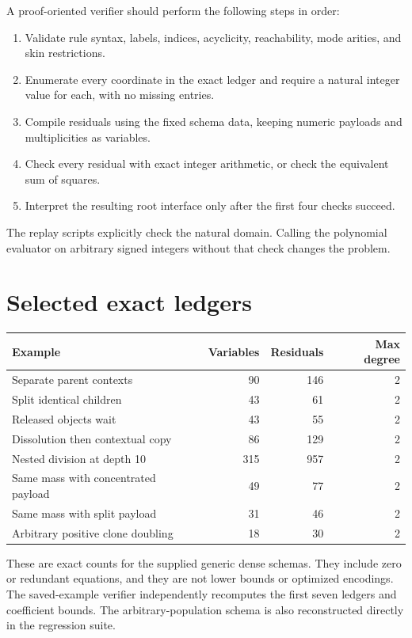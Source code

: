 \documentclass[11pt,letterpaper]{article}
\theoremstyle{definition}
\theoremstyle{remark}
\begin{document}
A proof-oriented verifier should perform the following steps in order:
\begin{enumerate}
\item Validate rule syntax, labels, indices, acyclicity, reachability, mode arities, and skin restrictions.
\item Enumerate every coordinate in the exact ledger and require a natural integer value for each, with no missing entries.
\item Compile residuals using the fixed schema data, keeping numeric payloads and multiplicities as variables.
\item Check every residual with exact integer arithmetic, or check the equivalent sum of squares.
\item Interpret the resulting root interface only after the first four checks succeed.
\end{enumerate}
The replay scripts explicitly check the natural domain. Calling the polynomial evaluator on arbitrary signed integers without that check changes the problem.

\section{Selected exact ledgers}\label{qoc:mm:app:ledgers}
\begin{center}
\begin{tabular}{lrrr}
\toprule
Example & Variables & Residuals & Max degree\\
\midrule
Separate parent contexts & 90 & 146 & 2\\
Split identical children & 43 & 61 & 2\\
Released objects wait & 43 & 55 & 2\\
Dissolution then contextual copy & 86 & 129 & 2\\
Nested division at depth 10 & 315 & 957 & 2\\
Same mass with concentrated payload & 49 & 77 & 2\\
Same mass with split payload & 31 & 46 & 2\\
Arbitrary positive clone doubling & 18 & 30 & 2\\
\bottomrule
\end{tabular}
\end{center}
These are exact counts for the supplied generic dense schemas. They include zero or redundant equations, and they are not lower bounds or optimized encodings. The saved-example verifier independently recomputes the first seven ledgers and coefficient bounds. The arbitrary-population schema is also reconstructed directly in the regression suite.
\end{document}
